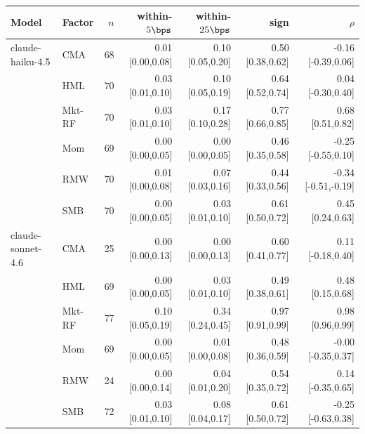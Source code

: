 \begin{tabular}{llr rrrr}
\toprule
Model & Factor & $n$ & within-$5\bps$ & within-$25\bps$ & sign & $\rho$ \\
\midrule
claude-haiku-4.5 & CMA & 68 & 0.01 [0.00,0.08] & 0.10 [0.05,0.20] & 0.50 [0.38,0.62] & -0.16 [-0.39,0.06] \\
 & HML & 70 & 0.03 [0.01,0.10] & 0.10 [0.05,0.19] & 0.64 [0.52,0.74] & 0.04 [-0.30,0.40] \\
 & Mkt-RF & 70 & 0.03 [0.01,0.10] & 0.17 [0.10,0.28] & 0.77 [0.66,0.85] & 0.68 [0.51,0.82] \\
 & Mom & 69 & 0.00 [0.00,0.05] & 0.00 [0.00,0.05] & 0.46 [0.35,0.58] & -0.25 [-0.55,0.10] \\
 & RMW & 70 & 0.01 [0.00,0.08] & 0.07 [0.03,0.16] & 0.44 [0.33,0.56] & -0.34 [-0.51,-0.19] \\
 & SMB & 70 & 0.00 [0.00,0.05] & 0.03 [0.01,0.10] & 0.61 [0.50,0.72] & 0.45 [0.24,0.63] \\
\midrule
claude-sonnet-4.6 & CMA & 25 & 0.00 [0.00,0.13] & 0.00 [0.00,0.13] & 0.60 [0.41,0.77] & 0.11 [-0.18,0.40] \\
 & HML & 69 & 0.00 [0.00,0.05] & 0.03 [0.01,0.10] & 0.49 [0.38,0.61] & 0.48 [0.15,0.68] \\
 & Mkt-RF & 77 & 0.10 [0.05,0.19] & 0.34 [0.24,0.45] & 0.97 [0.91,0.99] & 0.98 [0.96,0.99] \\
 & Mom & 69 & 0.00 [0.00,0.05] & 0.01 [0.00,0.08] & 0.48 [0.36,0.59] & -0.00 [-0.35,0.37] \\
 & RMW & 24 & 0.00 [0.00,0.14] & 0.04 [0.01,0.20] & 0.54 [0.35,0.72] & 0.14 [-0.35,0.65] \\
 & SMB & 72 & 0.03 [0.01,0.10] & 0.08 [0.04,0.17] & 0.61 [0.50,0.72] & -0.25 [-0.63,0.38] \\
\bottomrule
\end{tabular}

